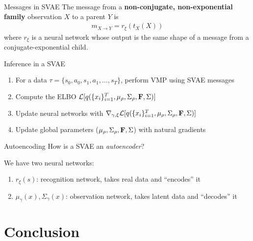 \documentclass[10pt, compress]{beamer}
\begin{document}
\begin{frame}{Messages in SVAE}
	The message from a \textbf{non-conjugate, non-exponential family} observation $X$ to a parent $Y$ is
	\begin{align*}
		m_{X \rightarrow Y} = r_\xi(t_X(X))
	\end{align*}
	where $r_\xi$ is a neural network whose output
	is the same shape of a message from a conjugate-exponential child.

	\pause
	\begin{block}{Inference in a SVAE}
		\begin{enumerate}
			\item For a data $\tau = \{s_0, a_0, s_1, a_1, \ldots, s_T\}$,
				perform VMP using SVAE messages
			\item Compute the ELBO $\mathcal{L}[q(\{x_i\}_{i = 1}^T, \mu_{\rho}, \Sigma_{\rho}, \mathbf{F}, \Sigma)]$
			\item Update neural networks with $\nabla_{\gamma, \xi} \mathcal{L}[q(\{x_i\}_{i = 1}^T, \mu_{\rho}, \Sigma_{\rho}, \mathbf{F}, \Sigma)]$
			\item Update global parameters ($\mu_{\rho}, \Sigma_{\rho}, \mathbf{F}, \Sigma$) with natural gradients
		\end{enumerate}
	\end{block}
\end{frame}

\begin{frame}{Autoencoding}
	How is a SVAE an \emph{autoencoder}?

	\begin{center}
		
	\end{center}

	\pause
	We have two neural networks:
	\begin{enumerate}
			\pause
		\item $r_\xi(s)$: recognition network, takes real data and ``encodes'' it
			\pause
		\item $\mu_\gamma(x), \Sigma_\gamma(x)$: observation network, takes latent data and ``decodes'' it
	\end{enumerate}
\end{frame}

\section{Conclusion}
\end{document}
